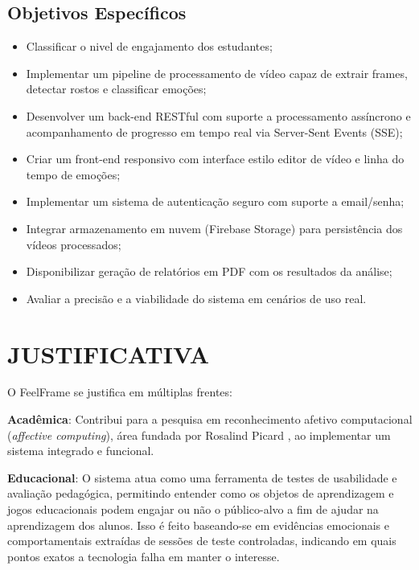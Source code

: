 \documentclass[
	12pt,
	openright,
	oneside,
	a4paper,
	english,
	brazil
	]{abntex2}
\begin{document}
\subsection{Objetivos Específicos}

\begin{itemize}
    \item Classificar o nivel de engajamento dos estudantes;
    
    \item Implementar um pipeline de processamento de vídeo capaz de extrair frames, detectar rostos e classificar emoções;

    
    \item Desenvolver um back-end RESTful com suporte a processamento assíncrono e acompanhamento de progresso em tempo real via Server-Sent Events (SSE);
    \item Criar um front-end responsivo com interface estilo editor de vídeo e linha do tempo de emoções;
    \item Implementar um sistema de autenticação seguro com suporte a email/senha;
    \item Integrar armazenamento em nuvem (Firebase Storage) para persistência dos vídeos processados;
    \item Disponibilizar geração de relatórios em PDF com os resultados da análise;
    \item Avaliar a precisão e a viabilidade do sistema em cenários de uso real.
\end{itemize}

\section{JUSTIFICATIVA}

O FeelFrame se justifica em múltiplas frentes:

\textbf{Acadêmica}: Contribui para a pesquisa em reconhecimento afetivo computacional (\textit{affective computing}), área fundada por Rosalind Picard \cite{picard1997affective}, ao implementar um sistema integrado e funcional.

\textbf{Educacional}: O sistema atua como uma ferramenta de testes de usabilidade e avaliação pedagógica, permitindo entender como os objetos de aprendizagem e jogos educacionais podem engajar ou não o público-alvo a fim de ajudar na aprendizagem dos alunos. Isso é feito baseando-se em evidências emocionais e comportamentais extraídas de sessões de teste controladas, indicando em quais pontos exatos a tecnologia falha em manter o interesse.
\end{document}
